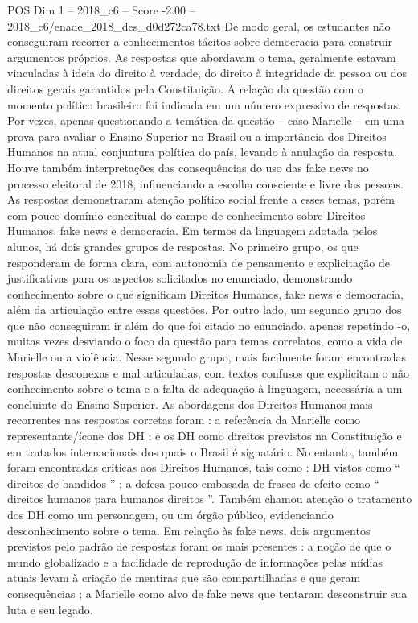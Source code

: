 \begin{textsample}{POS Dim 1 – 2018\_c6 – Score -2.00 – 2018\_c6/enade\_2018\_des\_d0d272ca78.txt}
De modo geral, os estudantes não conseguiram recorrer a conhecimentos tácitos sobre democracia para construir argumentos próprios.
As respostas que abordavam o tema, geralmente estavam vinculadas à ideia do direito à verdade, do direito à integridade da pessoa ou dos direitos gerais garantidos pela Constituição.
A relação da questão com o momento político brasileiro foi indicada em um número expressivo de respostas.
Por vezes, apenas questionando a temática da questão – caso Marielle – em uma prova para avaliar o Ensino Superior no Brasil ou a importância dos Direitos Humanos na atual conjuntura política do país, levando à anulação da resposta.
Houve também interpretações das consequências do uso das fake news no processo eleitoral de 2018, influenciando a escolha consciente e livre das pessoas.
As respostas demonstraram atenção político social frente a esses temas, porém com pouco domínio conceitual do campo de conhecimento sobre Direitos Humanos, fake news e democracia.
Em termos da linguagem adotada pelos alunos, há dois grandes grupos de respostas.
No primeiro grupo, os que responderam de forma clara, com autonomia de pensamento e explicitação de justificativas para os aspectos solicitados no enunciado, demonstrando conhecimento sobre o que significam Direitos Humanos, fake news e democracia, além da articulação entre essas questões.
Por outro lado, um segundo grupo dos que não conseguiram ir além do que foi citado no enunciado, apenas repetindo -o, muitas vezes desviando o foco da questão para temas correlatos, como a vida de Marielle ou a violência.
Nesse segundo grupo, mais facilmente foram encontradas respostas desconexas e mal articuladas, com textos confusos que explicitam o não conhecimento sobre o tema e a falta de adequação à linguagem, necessária a um concluinte do Ensino Superior.
As abordagens dos Direitos Humanos mais recorrentes nas respostas corretas foram : a referência da Marielle como representante/ícone dos DH ; e os DH como direitos previstos na Constituição e em tratados internacionais dos quais o Brasil é signatário.
No entanto, também foram encontradas críticas aos Direitos Humanos, tais como : DH vistos como “ direitos de bandidos ” ; a defesa pouco embasada de frases de efeito como “ direitos humanos para humanos direitos ”.
Também chamou atenção o tratamento dos DH como um personagem, ou um órgão público, evidenciando desconhecimento sobre o tema.
Em relação às fake news, dois argumentos previstos pelo padrão de respostas foram os mais presentes : a noção de que o mundo globalizado e a facilidade de reprodução de informações pelas mídias atuais levam à criação de mentiras que são compartilhadas e que geram consequências ; a Marielle como alvo de fake news que tentaram desconstruir sua luta e seu legado.

\end{textsample}
